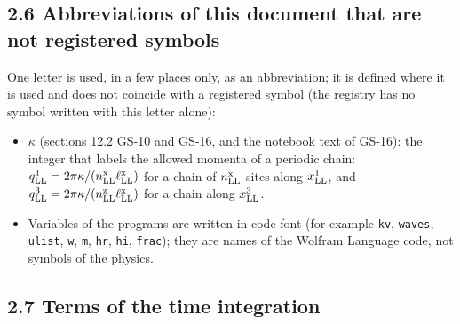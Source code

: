 \documentclass[
  10pt,
]{article}
\providecommand{\tightlist}{%
  \setlength{\itemsep}{0pt}\setlength{\parskip}{0pt}}
\begin{document}
\hypertarget{abbreviations-of-this-document-that-are-not-registered-symbols}{%
\subsection{2.6 Abbreviations of this document that are not registered
symbols}\label{abbreviations-of-this-document-that-are-not-registered-symbols}}

One letter is used, in a few places only, as an abbreviation; it is
defined where it is used and does not coincide with a registered symbol
(the registry has no symbol written with this letter alone):

\begin{itemize}
\tightlist
\item
  \(\kappa\) (sections 12.2 GS-10 and GS-16, and the notebook text of
  GS-16): the integer that labels the allowed momenta of a periodic
  chain:
  \(q^1_{\rm LL}=2\pi\kappa/(n^{\rm x}_{\rm LL}\ell^{\rm x}_{\rm LL})\)
  for a chain of \(n^{\rm x}_{\rm LL}\) sites along \(x^1_{\rm LL}\),
  and
  \(q^3_{\rm LL}=2\pi\kappa/(n^{\rm z}_{\rm LL}\ell^{\rm x}_{\rm LL})\)
  for a chain along \(x^3_{\rm LL}\).
\item
  Variables of the programs are written in code font (for example
  \texttt{kv}, \texttt{waves}, \texttt{ulist}, \texttt{w}, \texttt{m},
  \texttt{hr}, \texttt{hi}, \texttt{frac}); they are names of the
  Wolfram Language code, not symbols of the physics.
\end{itemize}

\hypertarget{terms-of-the-time-integration}{%
\subsection{2.7 Terms of the time
integration}\label{terms-of-the-time-integration}}
\end{document}
